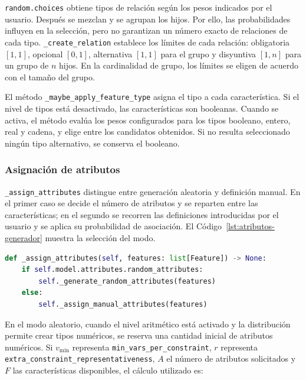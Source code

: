 \texttt{random.choices} obtiene tipos de relación según los pesos indicados
por el usuario. Después se mezclan y se agrupan los hijos. Por ello, las
probabilidades influyen en la selección, pero no garantizan un número exacto
de relaciones de cada tipo. \texttt{\_create\_relation} establece los
límites de cada relación: obligatoria $[1,1]$, opcional $[0,1]$,
alternativa $[1,1]$ para el grupo y disyuntiva $[1,n]$ para un grupo de
$n$ hijos. En la cardinalidad de grupo, los límites se eligen de acuerdo
con el tamaño del grupo.

El método \texttt{\_maybe\_apply\_feature\_type} asigna el tipo a cada
característica. Si el nivel de tipos está
desactivado, las características son booleanas. Cuando se activa, el método
evalúa los pesos configurados para los tipos booleano, entero, real y cadena,
y elige entre los candidatos obtenidos. Si no resulta seleccionado ningún
tipo alternativo, se conserva el booleano.

\subsubsection*{Asignación de atributos}

\texttt{\_assign\_attributes} distingue entre generación aleatoria y
definición manual. En el primer caso se decide el número de atributos y se
reparten entre las características; en el segundo se recorren las
definiciones introducidas por el usuario y se aplica su probabilidad de
asociación. El Código~\ref{lst:atributos-generador} muestra la selección del
modo.

\begin{lstlisting}[language=Python,
basicstyle=\ttfamily\footnotesize,breaklines=true,columns=fullflexible,
caption={Selección del modo de asignación de atributos.},
label={lst:atributos-generador}]
def _assign_attributes(self, features: list[Feature]) -> None:
    if self.model.attributes.random_attributes:
        self._generate_random_attributes(features)
    else:
        self._assign_manual_attributes(features)
\end{lstlisting}

En el modo aleatorio, cuando el nivel aritmético está activado y la
distribución permite crear tipos numéricos, se reserva una cantidad inicial
de atributos numéricos. Si $v_{\min}$ representa
\texttt{min\_vars\_per\_constraint}, $r$ representa
\texttt{extra\_constraint\_representativeness}, $A$ el número de atributos
solicitados y $F$ las características disponibles, el cálculo utilizado es:

